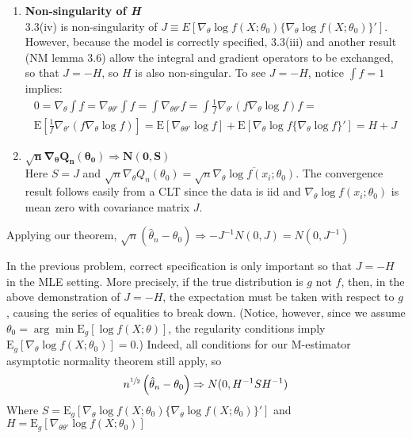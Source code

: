 \documentclass[11pt,letterpaper]{article}                  %
\begin{document}
\begin{problem}
\begin{enumerate}
\item \textbf{Non-singularity of \textit{H}} \\
3.3(iv) is non-singularity of $J \equiv E[\nabla_{\theta} \log
f(X;\theta_0) \{\nabla_{\theta} \log f(X;\theta_0)\}']$. However,
because the model is correctly specified, 3.3(iii)
and another result (NM lemma 3.6) allow the integral and gradient
operators to be exchanged, so that $J = -H$, so $H$ is also
non-singular. To see $J = -H$, notice $\int f = 1$ implies:
\begin{multline*}
  0 = \nabla_{\theta} \int f =
  \nabla_{\theta\theta'} \int f = \int  \nabla_{\theta \theta'}  f = \int
  \tfrac{1}{f} \nabla_{\theta'} (f \nabla_{\theta} \log f) f = \\
  \mathrm{E} [\tfrac{1}{f} \nabla_{\theta'} (f \nabla_{\theta} \log
  f)] = \mathrm{E}[\nabla_{\theta\theta'}\log f] +
  \mathrm{E}[\nabla_{\theta} \log f \{\nabla_{\theta} \log f\}'] = H + J
\end{multline*}

\item $\mathbf{\sqrt{n}\nabla_{\theta}Q_n(\theta_0) \Rightarrow
    N(0,S)}$ \\
  Here $S= J$ and
  $\sqrt{n}\nabla_{\theta}Q_n(\theta_0) = \sqrt{n}
  \overline{\nabla_{\theta}\log f(x_i; \theta_0)}$. The convergence
  result follows
  easily from a CLT since the data is iid and
  $\nabla_{\theta}\log f(x_i; \theta_0)$ is mean zero with covariance
  matrix $J$.
\end{enumerate}
Applying our theorem, $\sqrt{n}(\hat{\theta}_n - \theta_0) \Rightarrow
-J^{-1} N(0, J) = N(0, J^{-1})$ \\

\end{problem}

\bigskip
\begin{problem}
In the previous problem, correct specification is only important so
that $J = -H$ in the MLE setting. More precisely, if the true
distribution is $g$ not $f$, then, in the above demonstration of $J =
- H$, the expectation must be taken with respect to $g$, causing the
series of equalities to break down. (Notice, however, since we assume $\theta_0
= \arg\min \mathrm{E}_g[\log f(X;\theta)]$, the regularity conditions
imply $\mathrm{E}_g[\nabla_{\theta}\log f(X;\theta_0)] = 0$.) Indeed,
all conditions for
our M-estimator asymptotic normality theorem still apply, so
\begin{equation*}
  n^{\sfrac{1}{2}}\left( \hat{\theta}_n - \theta_0 \right) \Rightarrow
  N(0, H^{-1}S H^{-1})
\end{equation*}
Where $S = \mathrm{E}_g\left[\nabla_{\theta}\log f(X; \theta_0) \{\nabla_{\theta}\log
f(X; \theta_0)\}'\right]$ and $H = \mathrm{E}_g\left[ \nabla_{\theta\theta'}
  \log f(X; \theta_0)\right]$

\end{problem}
\end{document}

